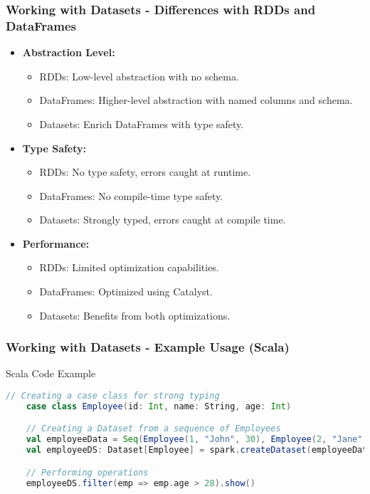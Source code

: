 \documentclass[aspectratio=169]{beamer}
\begin{document}
\begin{frame}[fragile]
    \frametitle{Working with Datasets - Differences with RDDs and DataFrames}
    \begin{itemize}
        \item \textbf{Abstraction Level:}
            \begin{itemize}
                \item RDDs: Low-level abstraction with no schema.
                \item DataFrames: Higher-level abstraction with named columns and schema.
                \item Datasets: Enrich DataFrames with type safety.
            \end{itemize}
        \item \textbf{Type Safety:}
            \begin{itemize}
                \item RDDs: No type safety, errors caught at runtime.
                \item DataFrames: No compile-time type safety.
                \item Datasets: Strongly typed, errors caught at compile time.
            \end{itemize}
        \item \textbf{Performance:}
            \begin{itemize}
                \item RDDs: Limited optimization capabilities.
                \item DataFrames: Optimized using Catalyst.
                \item Datasets: Benefits from both optimizations.
            \end{itemize}
    \end{itemize}
\end{frame}

\begin{frame}[fragile]
    \frametitle{Working with Datasets - Example Usage (Scala)}
    \begin{block}{Scala Code Example}
    \begin{lstlisting}[language=Scala]
    // Creating a case class for strong typing
    case class Employee(id: Int, name: String, age: Int)

    // Creating a Dataset from a sequence of Employees
    val employeeData = Seq(Employee(1, "John", 30), Employee(2, "Jane", 25))
    val employeeDS: Dataset[Employee] = spark.createDataset(employeeData)

    // Performing operations
    employeeDS.filter(emp => emp.age > 28).show()
    \end{lstlisting}
    \end{block}
\end{frame}
\end{document}
